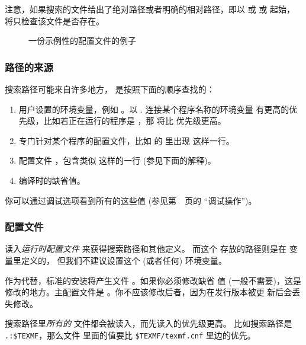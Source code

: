 \documentclass{article}
\begin{document}
注意，如果搜索的文件给出了绝对路径或者明确的相对路径，即以 \samp{/} 或  或
 起始，\KPS{} 将只检查该文件是否存在。

\ifSingleColumn
\else
\begin{figure*}

\setlength{\abovecaptionskip}{0pt}
  \caption{一份示例性的配置文件的例子}
  \label{fig:config-sample}
\end{figure*}
\fi

\subsubsection{路径的来源}
\label{sec:path-sources}

搜索路径可能来自许多地方，\KPS{} 是按照下面的顺序查找的：

\begin{enumerate}
\item
  用户设置的环境变量，例如 \@。以 . 连接某个程序名称的环境变量
有更高的优先级，比如若正在运行的程序是 ，那 
将比  优先级更高。
\item
  专门针对某个程序的配置文件，比如  的  里出现
 这样一行。
\item   \KPS{} 配置文件 ，包含类似
   这样的一行 (参见下面的解释)。
\item 编译时的缺省值。
\end{enumerate}
\noindent 你可以通过调试选项看到所有的这些值 (参见第~\pageref{sec:debugging}~页的
``调试操作'')。

\subsubsection{配置文件}

\KPS{} 读入\emph{运行时配置文件}  来获得搜索路径和其他定义。
而这个  存放的路径则是在  变量里定义的，
但我们不建议设置这个 (或者任何) 环境变量。

作为代替，标准的安装将产生文件 。如果你必须修改缺省
值 (一般不需要)，这是修改的地方。主配置文件是
。你不应该修改后者，因为在发行版本被更
新后会丢失修改。

搜索路径里\emph{所有的}  文件都会被读入，而先读入的优先级更高。
比如搜索路径是 \verb|.:$TEXMF|，那么文件  里面的值要比
\verb|$TEXMF/texmf.cnf| 里边的优先。
\end{document}
